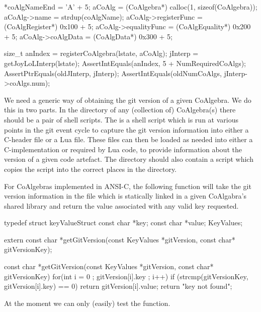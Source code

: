   *coAlgNameEnd        = 'A' + 5;
  aCoAlg               = (CoAlgebra*) calloc(1, sizeof(CoAlgebra));
  aCoAlg->name         = strdup(coAlgName);
  aCoAlg->registerFunc = (CoAlgRegister*) 0x100 + 5;
  aCoAlg->equalityFunc = (CoAlgEquality*) 0x200 + 5;
  aCoAlg->coAlgData    = (CoAlgData*)     0x300 + 5;
  
  size_t anIndex = registerCoAlgebra(lstate, aCoAlg);
  jInterp        = getJoyLoLInterp(lstate);
  AssertIntEquals(anIndex, 5 + NumRequiredCoAlgs);
  AssertPtrEquals(oldJInterp, jInterp);
  AssertIntEquals(oldNumCoAlgs, jInterp->coAlgs.num);
\stopCTest
\stopTestCase
\stopTestSuite

\startTestSuite[getGitVersion]

We need a generic way of obtaining the git version of a given CoAlgebra. 
We do this in two parts. In the  directory of any (collection 
of) CoAlgebra(s) there should be a pair of shell scripts. The 
 is a  shell script which is run at various 
points in the git event cycle to capture the git version information into 
either a C-header file or a Lua file. These files can then be loaded as 
needed into either a C-implementation or required by Lua code, to provide 
information about the version of a given code artefact. The  
directory should also contain a   script 
which copies the  script into the correct places in the 
 directory. 

For CoAlgebras implemented in ANSI-C, the following function will take the 
git version information in the  file which is 
statically linked in a given CoAlgabra's shared library and return the 
value associated with any valid key requested. 

\startCHeader
typedef struct keyValueStruct {
  const char *key;
  const char *value;
} KeyValues;

extern const char *getGitVersion(const KeyValues *gitVersion, 
                                 const char* gitVersionKey);
\stopCHeader

\startCCode
const char *getGitVersion(const KeyValues *gitVersion,
                          const char* gitVersionKey) {
  for(int i = 0 ; gitVersion[i].key ; i++) {
    if (strcmp(gitVersionKey, gitVersion[i].key) == 0) {
      return gitVersion[i].value;
    }
  }
  return "key not found";
}
\stopCCode

At the moment we can only (easily) test the  function.

